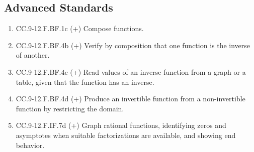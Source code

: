 \subsection*{Advanced Standards}
\begin{enumerate}
	\item CC.9-12.F.BF.1c (+) Compose functions. 
	\item CC.9-12.F.BF.4b (+) Verify by composition that one function is the inverse of another. 
	\item CC.9-12.F.BF.4c (+) Read values of an inverse function from a graph or a table, given that the function has an inverse.
	\item CC.9-12.F.BF.4d (+) Produce an invertible function from a non-invertible function by restricting the domain.
	\item CC.9-12.F.IF.7d (+) Graph rational functions, identifying zeros and asymptotes when suitable factorizations are available, and showing end behavior. 
\end{enumerate}
